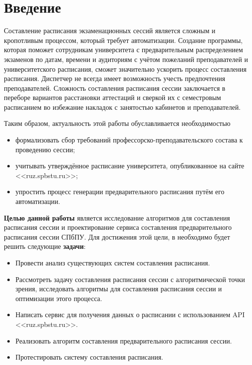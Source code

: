   
\chapter*{Введение} %

Составление расписания экзаменационных сессий является сложным и кропотливым процессом, который требует автоматизации. Создание программы, которая поможет сотрудникам университета с предварительным распределением экзаменов по датам, времени и аудиториям с учётом пожеланий преподавателей и университетского расписания, сможет значительно ускорить процесс составления расписания. Диспетчер не всегда имеет возможность учесть предпочтения преподавателей.
Сложность составления расписания сессии заключается в переборе вариантов расстановки аттестаций и сверкой их с семестровым расписанием во избежание накладок с занятостью кабинетов и преподавателей. 

Таким образом, актуальность этой работы обуславливается необходимостью
\begin{itemize}
	\item формализовать сбор требований профессорско-преподавательского состава к проведению сессии;
	\item учитывать утверждённое расписание университета, опубликованное на сайте <<ruz.spbstu.ru>>;
	\item упростить процесс генерации предварительного расписания путём его автоматизации.
\end{itemize}

\textbf{Целью данной работы} является исследование алгоритмов для составления расписания сессии и проектирование сервиса составления предварительного расписания сессии СПбПУ.
Для достижения этой цели, в необходимо будет решить следующие \textbf{задачи}:

\begin{itemize}
	\item Провести анализ существующих систем составления расписания.
	\item Рассмотреть задачу составления расписания сессии с алгоритмической точки зрения, исследовать алгоритмы для составления расписания сессии и оптимизации этого процесса.
	\item Написать сервис для получения данных о расписании с использованием API <<ruz.spbstu.ru>>. %
	\item Реализовать алгоритм составления предварительного расписания сессии. 
	\item Протестировать систему составления расписания.
\end{itemize}

